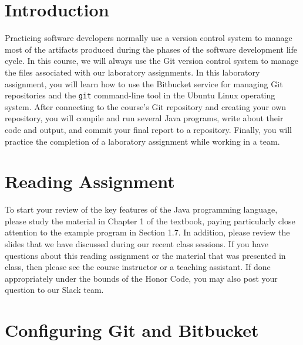 

\usepackage[compact]{titlesec}



\section*{Introduction}

Practicing software developers normally use a version control system to manage most of the artifacts produced during the
phases of the software development life cycle.  In this course, we will always use the Git version control system to
manage the files associated with our laboratory assignments.  In this laboratory assignment, you will learn how to use
the Bitbucket service for managing Git repositories and the {\tt git} command-line tool in the Ubuntu Linux operating
system. After connecting to the course's Git repository and creating your own repository, you will compile and run
several Java programs, write about their code and output, and commit your final report to a repository. Finally,
you will practice the completion of a laboratory assignment while working in a team.

\section*{Reading Assignment}

To start your review of the key features of the Java programming language, please study the material in Chapter 1 of
the textbook, paying particularly close attention to the example program in Section 1.7. In addition, please review the
slides that we have discussed during our recent class sessions. If you have questions about this reading assignment or
the material that was presented in class, then please see the course instructor or a teaching assistant. If done
appropriately under the bounds of the Honor Code, you may also post your question to our Slack team.

\section*{Configuring Git and Bitbucket}


